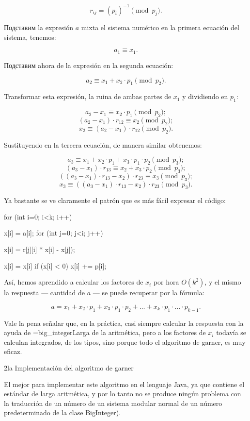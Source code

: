 $$ r_{ij} = (p_i) ^ {-1} \pmod {p_j} . $$

Подставим la expresión $a$ mixta el sistema numérico en la primera ecuación del sistema, tenemos:

$$ a_1 \equiv x_1. $$

Подставим ahora de la expresión en la segunda ecuación:

$$ a_2 \equiv x_1 + x_2 \cdot p_1 \pmod {p_2}. $$

Transformar esta expresión, la ruina de ambas partes de $x_1$ y dividiendo en $p_1$:

$$ a_2 - x_1 \equiv x_2 \cdot p_1 \pmod {p_2}; $$
$$ (a_2 - x_1) \cdot r_{12} \equiv x_2 \pmod {p_2}; $$
$$ x_2 \equiv (a_2 - x_1) \cdot r_{12} \pmod {p_2}. $$

Sustituyendo en la tercera ecuación, de manera similar obtenemos:

$$ a_3 \equiv { x_1 + x_2 \cdot p_1 + x_3 \cdot p_1 \cdot p_2 \pmod {p_3} }; $$
$$ (a_3 - x_1) \cdot r_{13} \equiv x_2 + x_3 \cdot p_2 \pmod {p_3}; $$
$$ ((a_3 - x_1) \cdot r_{13} - x_2) \cdot r_{23} \equiv x_3 \pmod {p_3}; $$
$$ x_3 \equiv ((a_3 - x_1) \cdot r_{13} - x_2) \cdot r_{23} \pmod {p_3}. $$

Ya bastante se ve claramente el patrón que es más fácil expresar el código:

\code
for (int i=0; i<k; i++) {
x[i] = a[i];
for (int j=0; j<i; j++) {
x[i] = r[j][i] * x[i] - x[j]);

x[i] = x[i] %
if (x[i] < 0) x[i] += p[i];
}
}
\endcode

Así, hemos aprendido a calcular los factores de $x_i$ por hora $O (k^2)$, y el mismo la respuesta --- cantidad de $a$ --- se puede recuperar por la fórmula:

$$ a = x_1 + x_2 \cdot p_1 + x_3 \cdot p_1 \cdot p_2 + \ldots + x_k \cdot p_1 \cdot \ldots \cdot p_{k-1}. $$

Vale la pena señalar que, en la práctica, casi siempre calcular la respuesta con la ayuda de \algohref=big_integer{Larga de la aritmética}, pero a los factores de $x_i$ todavía se calculan integrados, de los tipos, sino porque todo el algoritmo de garner, es muy eficaz.


\h2{la Implementación del algoritmo de garner}

El mejor para implementar este algoritmo en el lenguaje Java, ya que contiene el estándar de larga aritmética, y por lo tanto no se produce ningún problema con la traducción de un número de un sistema modular normal de un número predeterminado de la clase BigInteger).

